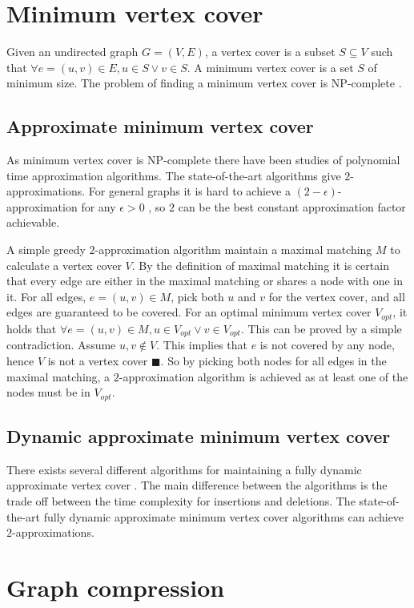 \section{Minimum vertex cover}
Given an undirected graph $G = (V,E)$, a vertex cover is a subset $S \subseteq V$ such that $\forall e = (u,v) \in E,  u \in S \vee v \in S$. A minimum vertex cover is a set $S$ of minimum size. The problem of finding a minimum vertex cover is NP-complete \cite{Kar72}.

\subsection{Approximate minimum vertex cover}
As minimum vertex cover is NP-complete there have been studies of polynomial time approximation algorithms. The state-of-the-art algorithms give $2$-approximations. For general graphs it is hard to achieve a $(2-\epsilon)$-approximation for any $\epsilon > 0$ \cite{2-evchard}, so $2$ can be the best constant approximation factor achievable.

A simple greedy $2$-approximation algorithm maintain a maximal matching $M$ to calculate a vertex cover $V$. By the definition of maximal matching it is certain that every edge are either in the maximal matching or shares a node with one in it. For all edges, $e = (u,v) \in M$, pick both $u$ and $v$ for the vertex cover, and all edges are guaranteed to be covered. For an optimal minimum vertex cover $V_{opt}$, it holds that $\forall e = (u,v) \in M, u \in V_{opt} \vee v \in V_{opt}$. This can be proved by a simple contradiction. Assume $u,v \notin V$. This implies that $e$ is not covered by any node, hence $V$ is not a vertex cover $\blacksquare$. So by picking both nodes for all edges in the maximal matching, a $2$-approximation algorithm is achieved as at least one of the nodes must be in $V_{opt}$.

\subsection{Dynamic approximate minimum vertex cover}
There exists several different algorithms for maintaining a fully dynamic approximate vertex cover \cite{2appdynvc, 2appdynvclogn, 2eappdynvc}. The main difference between the algorithms is the trade off between the time complexity for insertions and deletions. The state-of-the-art fully dynamic approximate minimum vertex cover algorithms can achieve $2$-approximations.


\section{Graph compression}
\label{sec:Compression}

